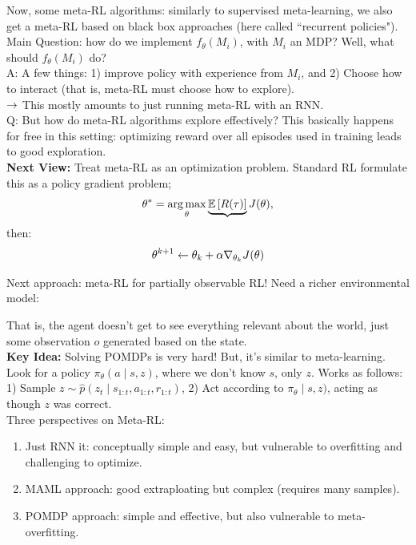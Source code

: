 Now, some meta-RL algorithms: similarly to supervised meta-learning, we also get a meta-RL based on black box approaches (here called ``recurrent policies"). \\

Main Question: how do we implement $f_\theta(M_i)$, with $M_i$ an MDP? Well, what should $f_\theta(M_i)$ do? \\

A: A few things: 1) improve policy with experience from $M_i$, and 2) Choose how to interact (that is, meta-RL must choose how to explore). \\

$\rightarrow$ This mostly amounts to just running meta-RL with an RNN. \\

Q: But how do meta-RL algorithms explore effectively? This basically happens for free in this setting: optimizing reward over all episodes used in training leads to good exploration.  \\

{\bf Next View:} Treat meta-RL as an optimization problem. Standard RL formulate this as a policy gradient problem;
\[
\theta^* = \operatorname*{arg\,max}_\theta \underbrace{\mathbb{E} \left[R(\tau)\right]}{J(\theta)},
\]
then:
\[
\theta^{k+1} \leftarrow \theta_k + \alpha \nabla_{\theta_k} J(\theta)
\]


Next approach: meta-RL for partially observable RL! Need a richer environmental model:

That is, the agent doesn't get to see everything relevant about the world, just some observation $o$ generated based on the state. \\

{\bf Key Idea:} Solving POMDPs is very hard! But, it's similar to meta-learning. Look for a policy $\pi_\theta(a \mid s, z)$, where we don't know $s$, only $z$. Works as follows: 1) Sample $z \sim \hat{p}(z_t \mid s_{1:t}, a_{1:t}, r_{1:t})$, 2) Act according to $\pi_\theta \mid s, z)$, acting as though $z$ was correct. \\


Three perspectives on Meta-RL:
\begin{enumerate}
\item Just RNN it: conceptually simple and easy, but vulnerable to overfitting and challenging to optimize.
\item MAML approach: good extraploating but complex (requires many samples).
\item POMDP approach: simple and effective, but also vulnerable to meta-overfitting.
\end{enumerate}


